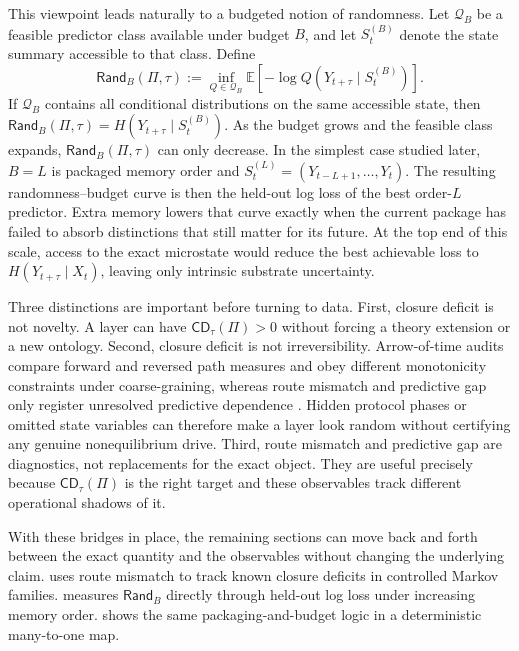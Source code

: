 \documentclass[11pt]{article}
\numberwithin{equation}{section}
\begin{document}
This viewpoint leads naturally to a budgeted notion of randomness. Let $\mathcal{Q}_B$ be a feasible predictor class available under budget $B$, and let $S_t^{(B)}$ denote the state summary accessible to that class. Define
\begin{equation}
\mathsf{Rand}_B(\Pi,\tau)
:=
\inf_{Q \in \mathcal{Q}_B}
\mathbb{E}\!\left[
-\log Q(Y_{t+\tau}\mid S_t^{(B)})
\right].
\label{eq:budgeted-rand}
\end{equation}
If $\mathcal{Q}_B$ contains all conditional distributions on the same accessible state, then $\mathsf{Rand}_B(\Pi,\tau)=H(Y_{t+\tau}\mid S_t^{(B)})$. As the budget grows and the feasible class expands, $\mathsf{Rand}_B(\Pi,\tau)$ can only decrease. In the simplest case studied later, $B=L$ is packaged memory order and $S_t^{(L)}=(Y_{t-L+1},\dots,Y_t)$. The resulting randomness--budget curve is then the held-out log loss of the best order-$L$ predictor. Extra memory lowers that curve exactly when the current package has failed to absorb distinctions that still matter for its future. At the top end of this scale, access to the exact microstate would reduce the best achievable loss to $H(Y_{t+\tau}\mid X_t)$, leaving only intrinsic substrate uncertainty.

Three distinctions are important before turning to data. First, closure deficit is not novelty. A layer can have $\mathsf{CD}_\tau(\Pi)>0$ without forcing a theory extension or a new ontology. Second, closure deficit is not irreversibility. Arrow-of-time audits compare forward and reversed path measures and obey different monotonicity constraints under coarse-graining, whereas route mismatch and predictive gap only register unresolved predictive dependence \citep{tsiokos2026sixbirds,esposito2012stochasticthermodynamicsundercoarsegraining}. Hidden protocol phases or omitted state variables can therefore make a layer look random without certifying any genuine nonequilibrium drive. Third, route mismatch and predictive gap are diagnostics, not replacements for the exact object. They are useful precisely because $\mathsf{CD}_\tau(\Pi)$ is the right target and these observables track different operational shadows of it.

With these bridges in place, the remaining sections can move back and forth between the exact quantity and the observables without changing the underlying claim.  uses route mismatch to track known closure deficits in controlled Markov families.  measures $\mathsf{Rand}_B$ directly through held-out log loss under increasing memory order.  shows the same packaging-and-budget logic in a deterministic many-to-one map.
\end{document}

